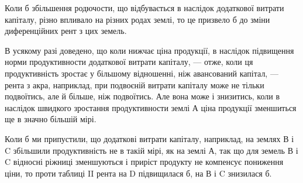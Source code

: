 Коли б збільшення родючости, що відбувається в наслідок додаткової витрати
капіталу, різно впливало на різних родах землі, то це призвело б до зміни
диференційних рент з цих земель.

В усякому разі доведено, що коли нижчає ціна продукції, в наслідок
підвищення норми продуктивности додаткової витрати капіталу, —
отже, коли ця продуктивність зростає у більшому відношенні, ніж авансований
капітал, — рента з акра, наприклад, при подвоєній витрати капіталу може не
тільки подвоїтись, але й більше, ніж подвоїтись. Але вона може і знизитись,
коли в наслідок швидкого зростання продуктивности землі А ціна продукції
зменшиться ще в значно більшій мірі.

Коли б ми припустили, що додаткові витрати капіталу, наприклад, на землях
В і C збільшили продуктивність не в такій мірі, як на землі А, так що для земель
В і C відносні ріжниці зменшуються і приріст продукту не компенсує пониження
ціни, то проти таблиці II рента на D підвищилася б, на В і C знизилася
б.

